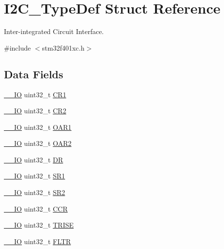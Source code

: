 \hypertarget{struct_i2_c___type_def}{}\section{I2\+C\+\_\+\+Type\+Def Struct Reference}
\label{struct_i2_c___type_def}


Inter-\/integrated Circuit Interface.  




{\ttfamily \#include $<$stm32f401xc.\+h$>$}

\subsection*{Data Fields}
\begin{DoxyCompactItemize}
\item 
\hyperlink{core__sc300_8h_aec43007d9998a0a0e01faede4133d6be}{\+\_\+\+\_\+\+IO} uint32\+\_\+t \hyperlink{struct_i2_c___type_def_ab0ec7102960640751d44e92ddac994f0}{C\+R1}
\item 
\hyperlink{core__sc300_8h_aec43007d9998a0a0e01faede4133d6be}{\+\_\+\+\_\+\+IO} uint32\+\_\+t \hyperlink{struct_i2_c___type_def_afdfa307571967afb1d97943e982b6586}{C\+R2}
\item 
\hyperlink{core__sc300_8h_aec43007d9998a0a0e01faede4133d6be}{\+\_\+\+\_\+\+IO} uint32\+\_\+t \hyperlink{struct_i2_c___type_def_a08b4be0d626a00f26bc295b379b3bba6}{O\+A\+R1}
\item 
\hyperlink{core__sc300_8h_aec43007d9998a0a0e01faede4133d6be}{\+\_\+\+\_\+\+IO} uint32\+\_\+t \hyperlink{struct_i2_c___type_def_ab5c57ffed0351fa064038939a6c0bbf6}{O\+A\+R2}
\item 
\hyperlink{core__sc300_8h_aec43007d9998a0a0e01faede4133d6be}{\+\_\+\+\_\+\+IO} uint32\+\_\+t \hyperlink{struct_i2_c___type_def_a3df0d8dfcd1ec958659ffe21eb64fa94}{DR}
\item 
\hyperlink{core__sc300_8h_aec43007d9998a0a0e01faede4133d6be}{\+\_\+\+\_\+\+IO} uint32\+\_\+t \hyperlink{struct_i2_c___type_def_acefca4fd83c4b7846ae6d3cfe7bb8df9}{S\+R1}
\item 
\hyperlink{core__sc300_8h_aec43007d9998a0a0e01faede4133d6be}{\+\_\+\+\_\+\+IO} uint32\+\_\+t \hyperlink{struct_i2_c___type_def_a89623ee198737b29dc0a803310605a83}{S\+R2}
\item 
\hyperlink{core__sc300_8h_aec43007d9998a0a0e01faede4133d6be}{\+\_\+\+\_\+\+IO} uint32\+\_\+t \hyperlink{struct_i2_c___type_def_a5e1322e27c40bf91d172f9673f205c97}{C\+CR}
\item 
\hyperlink{core__sc300_8h_aec43007d9998a0a0e01faede4133d6be}{\+\_\+\+\_\+\+IO} uint32\+\_\+t \hyperlink{struct_i2_c___type_def_a5d5764c0ec44b661da957e6343f9e7b5}{T\+R\+I\+SE}
\item 
\hyperlink{core__sc300_8h_aec43007d9998a0a0e01faede4133d6be}{\+\_\+\+\_\+\+IO} uint32\+\_\+t \hyperlink{struct_i2_c___type_def_aa23ced8246d69edb9261a8de1f1e253f}{F\+L\+TR}
\end{DoxyCompactItemize}


